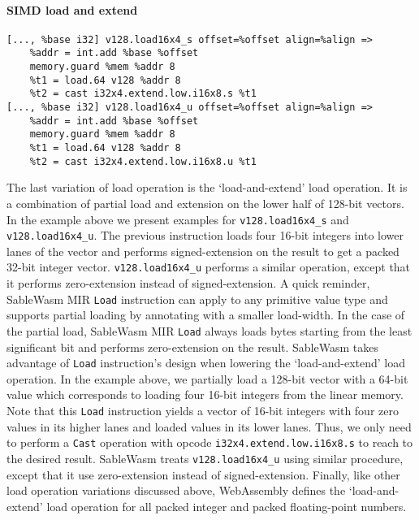 \paragraph{SIMD load and extend} \quad
\begin{lstlisting}[basicstyle=\linespread{1}\small\ttfamily, language=SableWasmMIR]
[..., %base i32] v128.load16x4_s offset=%offset align=%align =>
    %addr = int.add %base %offset
    memory.guard %mem %addr 8
    %t1 = load.64 v128 %addr 8
    %t2 = cast i32x4.extend.low.i16x8.s %t1
[..., %base i32] v128.load16x4_u offset=%offset align=%align =>
    %addr = int.add %base %offset
    memory.guard %mem %addr 8
    %t1 = load.64 v128 %addr 8
    %t2 = cast i32x4.extend.low.i16x8.u %t1
\end{lstlisting}
The last variation of load operation is the `load-and-extend' load operation. It is a combination of partial load and extension on the lower half of 128-bit vectors. In the example above we present examples for \texttt{v128.load16x4\_s} and \texttt{v128.load16x4\_u}. The previous instruction loads four 16-bit integers into lower lanes of the vector and performs signed-extension on the result to get a packed 32-bit integer vector. \texttt{v128.load16x4\_u} performs a similar operation, except that it performs zero-extension instead of signed-extension. A quick reminder, SableWasm MIR \texttt{Load} instruction can apply to any primitive value type and supports partial loading by annotating with a smaller load-width. In the case of the partial load, SableWasm MIR \texttt{Load} always loads bytes starting from the least significant bit and performs zero-extension on the result. SableWasm takes advantage of \texttt{Load} instruction's design when lowering the `load-and-extend' load operation. In the example above, we partially load a 128-bit vector with a 64-bit value which corresponds to loading four 16-bit integers from the linear memory. Note that this \texttt{Load} instruction yields a vector of 16-bit integers with four zero values in its higher lanes and loaded values in its lower lanes. Thus, we only need to perform a \texttt{Cast} operation with opcode \texttt{i32x4.extend.low.i16x8.s} to reach to the desired result. SableWasm treats \texttt{v128.load16x4\_u} using similar procedure, except that it use zero-extension instead of signed-extension. Finally, like other load operation variations discussed above, WebAssembly defines the `load-and-extend' load operation for all packed integer and packed floating-point numbers.

